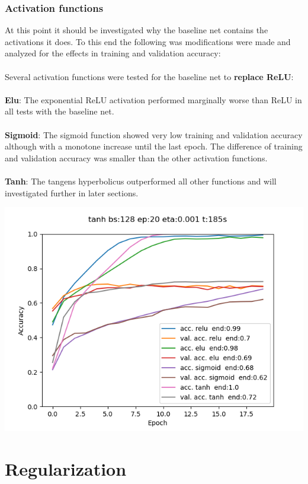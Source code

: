 \documentclass{article}
\newenvironment{Figure}
{\par\medskip\noindent\minipage{\linewidth}}
{\endminipage\par\medskip}
\begin{document}
\begin{multicols}{2}
\subsubsection{Activation functions}
At this point it should be investigated why the baseline net contains the activations it does. To this end the following was modifications were made and analyzed for the effects in training and validation accuracy:\\
\\
Several activation functions were tested for the baseline net to \textbf{replace ReLU}:\\
\\
\textbf{Elu}: The exponential ReLU activation performed marginally worse than ReLU in all tests with the baseline net.\\
\\
\textbf{Sigmoid}: The sigmoid function showed very low training and validation accuracy although with a monotone increase until the last epoch. The difference of training and validation accuracy was smaller than the other activation functions. \\
\\
\textbf{Tanh}: The tangens hyperbolicus outperformed all other functions and will investigated further in later sections.

\begin{Figure}
	\label{fig:known_init}
	\centering
	\includegraphics[width=\linewidth]{../img_1_4_activation/activation_comp}
\end{Figure}

\section{Regularization}
\label{regularization}

\end{multicols}
\end{document}
